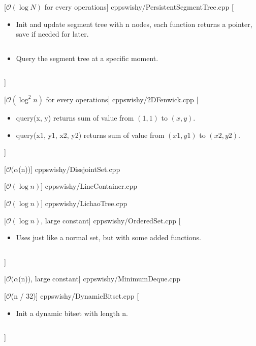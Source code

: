 \documentclass[8pt,a4paper,oneside,twocolumn]{extarticle}
\begin{document}
[$\mathcal{O}(\log N)$ for every operations]
{cpp}{swishy/PersistentSegmentTree.cpp}
[
    \begin{itemize}
        \item Init and update segment tree with n nodes, each function returns a pointer, save if needed for later. \inputminted{cpp}{swishy/examples/PersistentSegmentTree1.cpp}
        \item Query the segment tree at a specific moment. \inputminted{cpp}{swishy/examples/PersistentSegmentTree2.cpp}
    \end{itemize}
]

[$\mathcal{O}(\log^2 n)$ for every operations]
{cpp}{swishy/2DFenwick.cpp}
[
    \begin{itemize}
        \item query(x, y) returns sum of value from $(1, 1)$ to $(x, y)$.
        \item query(x1, y1, x2, y2) returns sum of value from $(x1, y1)$ to $(x2, y2)$.
    \end{itemize}
]

[$\mathcal{O}(\alpha$(n))]
{cpp}{swishy/DissjointSet.cpp}

[$\mathcal{O}(\log n)$]
{cpp}{swishy/LineContainer.cpp}

[$\mathcal{O}(\log n)$]
{cpp}{swishy/LichaoTree.cpp}

[$\mathcal{O}(\log n)$, large constant]
{cpp}{swishy/OrderedSet.cpp}
[
    \begin{itemize}
        \item Uses just like a normal set, but with some added functions. \inputminted{cpp}{swishy/examples/OrderedSet.cpp}
    \end{itemize}
]

[$\mathcal{O}(\alpha$(n)), large constant]
{cpp}{swishy/MinimumDeque.cpp}

[$\mathcal{O}$(n / 32)]
{cpp}{swishy/DynamicBitset.cpp}
[
    \begin{itemize}
        \item Init a dynamic bitset with length n. \inputminted{cpp}{swishy/examples/DynamicBitset.cpp}
    \end{itemize}
]
\end{document}
